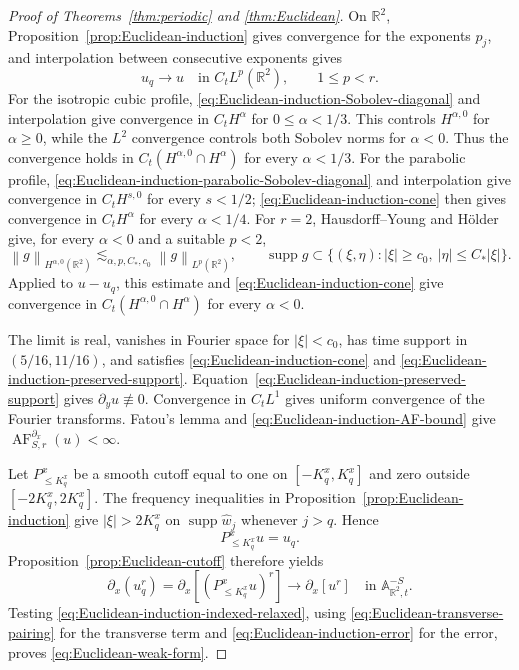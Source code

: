 \documentclass[12pt,reqno,letterpaper]{amsart}
\numberwithin{equation}{section}
\theoremstyle{definition}
\newcommand{\R}{\mathbb R}
\newcommand{\A}{\mathbb A}
\newcommand{\supp}{\operatorname{supp}}
\newcommand{\norm}[1]{\left\lVert #1\right\rVert}
\newcommand{\abs}[1]{\left\lvert #1\right\rvert}
\begin{document}
\begin{proof}[Proof of Theorems~\ref{thm:periodic} and
\ref{thm:Euclidean}]
On $\R^2$, Proposition~\ref{prop:Euclidean-induction} gives convergence
for the exponents $p_j$, and interpolation between consecutive exponents
gives
\[
 u_q\longrightarrow u\quad\text{in }C_tL^p(\R^2),
 \qquad 1\leq p<r.
\]
For the isotropic cubic profile,
\eqref{eq:Euclidean-induction-Sobolev-diagonal} and interpolation give convergence in
$C_tH^\alpha$ for $0\leq\alpha<1/3$.  This controls $H^{\alpha,0}$
for $\alpha\geq0$, while the $L^2$ convergence controls both Sobolev
norms for $\alpha<0$.  Thus the convergence holds in
$C_t(H^{\alpha,0}\cap H^\alpha)$ for every $\alpha<1/3$.  For the
parabolic profile,
\eqref{eq:Euclidean-induction-parabolic-Sobolev-diagonal} and
interpolation give convergence in $C_tH^{s,0}$ for every $s<1/2$;
\eqref{eq:Euclidean-induction-cone} then gives convergence in
$C_tH^\alpha$ for every $\alpha<1/4$.  For $r=2$,
Hausdorff--Young and H\"older give, for every $\alpha<0$ and a suitable
$p<2$,
\[
 \norm g_{H^{\alpha,0}(\R^2)}
 \lesssim_{\alpha,p,C_*,c_0}\norm g_{L^p(\R^2)},
 \qquad
 \supp\widehat g\subset
 \{(\xi,\eta):\abs\xi\geq c_0,\ \abs\eta\leq C_*\abs\xi\}.
\]
Applied to $u-u_q$, this estimate and
\eqref{eq:Euclidean-induction-cone} give convergence in
$C_t(H^{\alpha,0}\cap H^\alpha)$ for every $\alpha<0$.

The limit is real, vanishes in Fourier space for $\abs\xi<c_0$, has time
support in $(5/16,11/16)$, and satisfies
\eqref{eq:Euclidean-induction-cone} and
\eqref{eq:Euclidean-induction-preserved-support}.
Equation~\eqref{eq:Euclidean-induction-preserved-support} gives
$\partial_yu\not\equiv0$.  Convergence in $C_tL^1$ gives uniform
convergence of the Fourier transforms.  Fatou's lemma and
\eqref{eq:Euclidean-induction-AF-bound} give
$\operatorname{AF}^{\partial_x}_{S,r}(u)<\infty$.

Let $P_{\leq K_q^x}^x$ be a smooth cutoff equal to one on
$[-K_q^x,K_q^x]$ and zero outside $[-2K_q^x,2K_q^x]$.
The frequency inequalities in Proposition~\ref{prop:Euclidean-induction}
give $\abs\xi>2K_q^x$ on $\supp\widehat w_j$ whenever $j>q$.  Hence
\[
 P_{\leq K_q^x}^xu=u_q.
\]
Proposition~\ref{prop:Euclidean-cutoff} therefore yields
\[
 \partial_x(u_q^r)=\partial_x[(P_{\leq K_q^x}^xu)^r]
 \longrightarrow\partial_x[u^r]
 \quad\text{in }\A^{-S}_{\R^2,t}.
\]
Testing \eqref{eq:Euclidean-induction-indexed-relaxed}, using
\eqref{eq:Euclidean-transverse-pairing} for the transverse term and
\eqref{eq:Euclidean-induction-error} for the error, proves
\eqref{eq:Euclidean-weak-form}.


\end{proof}
\end{document}
